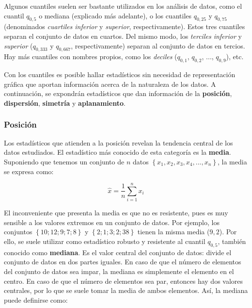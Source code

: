 \documentclass[12pt]{article}
\begin{document}
Algunos cuantiles suelen ser bastante utilizados en los análisis de datos, como el cuantil $q_{0,5}$ o mediana (explicado más adelante), o los cuantiles $q_{0,25}$ y $q_{0,75}$ (denominados \textit{cuartiles inferior} y \textit{superior}, respectivamente). Estos tres cuantiles separan el conjunto de datos en cuartos. Del mismo modo, los \textit{terciles inferior} y \textit{superior} ($q_{0,333}$ y $q_{0,667}$, respectivamente) separan al conjunto de datos en tercios. Hay más cuantiles con nombres propios, como los \textit{deciles} ($q_{0,1}$, $q_{0,2}$, ..., $q_{0,9}$), etc.

Con los cuantiles es posible hallar estadísticos sin necesidad de representación gráfica que aportan información acerca de la naturaleza de los datos. A continuación, se expondrán estadísticos que dan información de la \textbf{posición}, \textbf{dispersión}, \textbf{simetría} y \textbf{aplanamiento}.

\subsubsection{Posición}

Los estadísticos que atienden a la posición revelan la tendencia central de los datos estudiados. El estadístico más conocido de esta categoría es la \textbf{media}. Suponiendo que tenemos un conjunto de $n$ datos $\left\lbrace x_{1}, x_{2}, x_{3}, x_{4}, ..., x_{n} \right\rbrace$, la media se expresa como:

\begin{equation}
\hat{x} = \frac{1}{n} \sum^{n}_{i = 1} x_{i}
\label{eq:mean}
\end{equation}

El inconveniente que presenta la media es que no es resistente, pues es muy sensible a los valores extremos en un conjunto de datos. Por ejemplo, los conjuntos $\left\lbrace 10; 12; 9; 7; 8 \right\rbrace$ y $\left\lbrace 2; 1; 3; 2; 38 \right\rbrace$ tienen la misma media ($9,2$). Por ello, se suele utilizar como estadístico robusto y resistente al cuantil $q_{0,5}$, también conocido como \textbf{mediana}. Es el valor central del conjunto de datos: divide el conjunto de datos en dos partes iguales. En caso de que el número de elementos del conjunto de datos sea impar, la mediana es simplemente el elemento en el centro. En caso de que el número de elementos sea par, entonces hay dos valores centrales, por lo que se suele tomar la media de ambos elementos. Así, la mediana puede definirse como:
\end{document}
